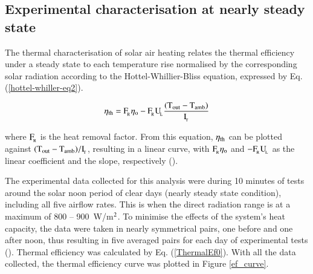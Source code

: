 \newpage
\subsection{Experimental characterisation at nearly steady state}

The thermal characterisation of solar air heating relates the thermal efficiency under a steady state to each temperature rise normalised by the corresponding solar radiation according to the Hottel-Whillier-Bliss equation, expressed by Eq. (\ref{hottel-whiller-eq2}).

\vspace{-0.75cm}
\begin{equation}
\mathrm{\eta_{\rm{th}} = {F_{\!_R}}\eta_o - {F_{\!_R}}{U_{\!_L}}\frac{(T_{out} - T_{amb})}{I_{\!_T}}}
\label{hottel-whiller-eq2}
\end{equation}

\noindent where $\rm{F_{\!_R}}$ is the heat removal factor. From this equation, $\eta_{\rm{th}}$ can be plotted against $\rm{(T_{out} - T_{amb})/I_{\!_T}}$, resulting in a linear curve, with $\rm{F_{\!_R}}\eta_{\rm{o}}$ and $\rm{- F_{\!_R}{U_{\!_L}}}$ as the linear coefficient and the slope, respectively (\cite{Goswami2015}). 

The experimental data collected for this analysis were during 10 minutes of tests around the solar noon period of clear days (nearly steady state condition), including all five airflow rates. This is when the direct radiation range is at a maximum of 800 -- 900~W/m$^{\rm{2}}$. To minimise the effects of the system's heat capacity, the data were taken in nearly symmetrical pairs, one before and one after noon, thus resulting in five averaged pairs for each day of experimental tests (\cite{Duffie2013}). Thermal efficiency was calculated by Eq. (\ref{ThermalEf0}). With all the data collected, the thermal efficiency curve was plotted in Figure \ref{ef_curve}. 


